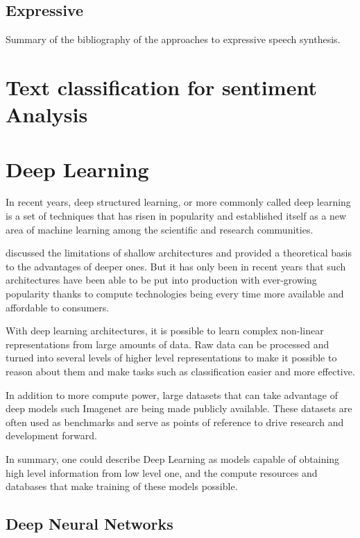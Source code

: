 \subsection{Expressive}

Summary of the bibliography of the approaches to expressive speech synthesis.

\section{Text classification for sentiment Analysis}


\section{Deep Learning}

In recent years, deep structured learning, or more commonly called deep learning is a set of techniques that has risen in popularity and established itself as a new area of machine learning among the scientific and research communities. \cite{deng2014deep}

\cite{bengio2009learning} discussed the limitations of shallow architectures and provided a theoretical basis to the advantages of deeper ones. But it has only been in recent years that such architectures have been able to be put into production with ever-growing popularity thanks to compute technologies being every time more available and affordable to consumers.

With deep learning architectures, it is possible to learn complex non-linear representations from large amounts of data. Raw data can be processed and turned into several levels of higher level representations to make it possible to reason about them and make tasks such as classification easier and more effective.

In addition to more compute power, large datasets that can take advantage of deep models such Imagenet \cite{russakovsky2015imagenet} are being made publicly available. These datasets are often used as benchmarks and serve as points of reference to drive research and development forward.

In summary, one could describe Deep Learning as models capable of obtaining high level information from low level one, and the compute resources and databases that make training of these models possible.

\subsection{Deep Neural Networks}

